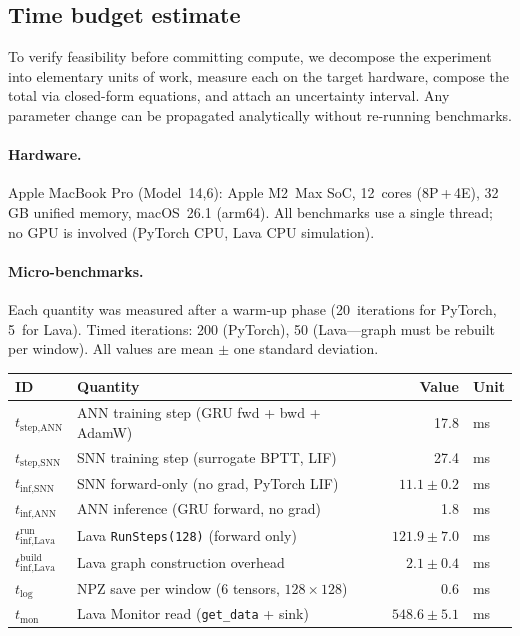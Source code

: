 \documentclass[11pt,a4paper]{article}
\begin{document}
\subsection{Time budget estimate}\label{sec:time-budget}

To verify feasibility before committing compute, we decompose the
experiment into elementary units of work, measure each on the target
hardware, compose the total via closed-form equations, and attach an
uncertainty interval.  Any parameter change can be propagated
analytically without re-running benchmarks.

\paragraph{Hardware.}
Apple MacBook Pro (Model~14,6): Apple M2~Max SoC,
12~cores (8P\,+\,4E), 32\,GB unified memory,
macOS~26.1 (arm64).  All benchmarks use a single thread;
no GPU is involved (PyTorch CPU, Lava CPU simulation).

\paragraph{Micro-benchmarks.}
Each quantity was measured after a warm-up phase (20~iterations for
PyTorch, 5~for Lava).  Timed iterations: 200 (PyTorch),
50 (Lava---graph must be rebuilt per window).  All values are
mean $\pm$ one standard deviation.

\begin{center}
\renewcommand{\arraystretch}{1.12}
\begin{tabular}{@{}llrl@{}}
\toprule
\textbf{ID} & \textbf{Quantity} & \textbf{Value} & \textbf{Unit} \\
\midrule
$t_{\text{step,ANN}}$
  & ANN training step (GRU fwd + bwd + AdamW)
  & 17.8 & ms \\
$t_{\text{step,SNN}}$
  & SNN training step (surrogate BPTT, LIF)
  & 27.4 & ms \\
$t_{\text{inf,SNN}}$
  & SNN forward-only (no grad, PyTorch LIF)
  & $11.1 \pm 0.2$ & ms \\
$t_{\text{inf,ANN}}$
  & ANN inference (GRU forward, no grad)
  & 1.8 & ms \\
$t_{\text{inf,Lava}}^{\text{run}}$
  & Lava \texttt{RunSteps(128)} (forward only)
  & $121.9 \pm 7.0$ & ms \\
$t_{\text{inf,Lava}}^{\text{build}}$
  & Lava graph construction overhead
  & $2.1 \pm 0.4$ & ms \\
$t_{\text{log}}$
  & NPZ save per window (6 tensors, $128 \times 128$)
  & 0.6 & ms \\
$t_{\text{mon}}$
  & Lava Monitor read (\texttt{get\_data} + sink)
  & $548.6 \pm 5.1$ & ms \\
\bottomrule
\end{tabular}
\end{center}
\end{document}
